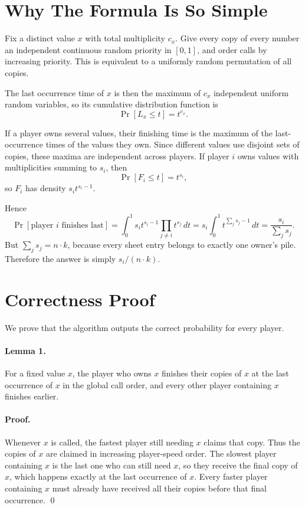 \documentclass[11pt]{article}
\begin{document}
\section*{Why The Formula Is So Simple}

Fix a distinct value $x$ with total multiplicity $c_x$. Give every copy of every number an independent
continuous random priority in $[0,1]$, and order calls by increasing priority. This is equivalent to a
uniformly random permutation of all copies.

The last occurrence time of $x$ is then the maximum of $c_x$ independent uniform random variables, so
its cumulative distribution function is
\[
    \Pr[L_x \le t] = t^{c_x}.
\]

If a player owns several values, their finishing time is the maximum of the last-occurrence times of the
values they own. Since different values use disjoint sets of copies, these maxima are independent across
players. If player $i$ owns values with multiplicities summing to $s_i$, then
\[
    \Pr[F_i \le t] = t^{s_i},
\]
so $F_i$ has density $s_i t^{s_i - 1}$.

Hence
\[
    \Pr[\text{player } i \text{ finishes last}]
    = \int_0^1 s_i t^{s_i - 1} \prod_{j \ne i} t^{s_j} \, dt
    = s_i \int_0^1 t^{\sum_j s_j - 1} \, dt
    = \frac{s_i}{\sum_j s_j}.
\]
But $\sum_j s_j = n \cdot k$, because every sheet entry belongs to exactly one owner's pile. Therefore
the answer is simply $s_i / (n \cdot k)$.

\section*{Correctness Proof}

We prove that the algorithm outputs the correct probability for every player.

\paragraph{Lemma 1.}
For a fixed value $x$, the player who owns $x$ finishes their copies of $x$ at the last occurrence of $x$
in the global call order, and every other player containing $x$ finishes earlier.

\paragraph{Proof.}
Whenever $x$ is called, the fastest player still needing $x$ claims that copy. Thus the copies of $x$ are
claimed in increasing player-speed order. The slowest player containing $x$ is the last one who can still
need $x$, so they receive the final copy of $x$, which happens exactly at the last occurrence of $x$.
Every faster player containing $x$ must already have received all their copies before that final occurrence.
\qed
\end{document}
